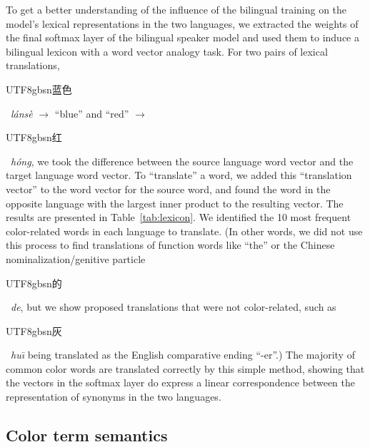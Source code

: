 \documentclass[11pt,a4paper]{article}
\newenvironment{zh}{\begin{CJK}{UTF8}{gbsn}}{\end{CJK}}
\newcommand{\textzh}[2]{\begin{zh}#1\end{zh}~\emph{#2}}
\renewcommand{\|}{\mid}
\newcommand{\tabref}[1]{Table~\ref{#1}}
\begin{document}
To get a better understanding of the influence of the bilingual training on the model's lexical
representations in the two languages, we extracted the weights of the final softmax layer of the bilingual
speaker model and used them to induce a bilingual lexicon with a word vector analogy task.
For two pairs of lexical translations, \textzh{蓝色}{l\'ans\`e} $\rightarrow$ ``blue'' and ``red''
$\rightarrow$ \textzh{红}{h\'ong}, we took the difference between the source language word vector and
the target language word vector. To ``translate'' a word, we added this ``translation vector'' to the
word vector for the source word, and found the
word in the opposite language with the largest inner product to the resulting vector.
The results are presented in \tabref{tab:lexicon}. We identified the 10 most frequent color-related words in each language to translate. (In other words,
we did not use this process to find translations of function words like ``the'' or the Chinese
nominalization/genitive particle \textzh{的}{de}, but we show proposed translations that were not
color-related, such as \textzh{灰}{hu\={\i}} being translated as the English comparative ending ``-er''.)
The majority of common color words are translated correctly by this simple method, showing that the vectors in
the softmax layer do express a linear correspondence between the representation of synonyms in the two languages.

\subsection{Color term semantics} \label{sec:wcs}
\end{document}
